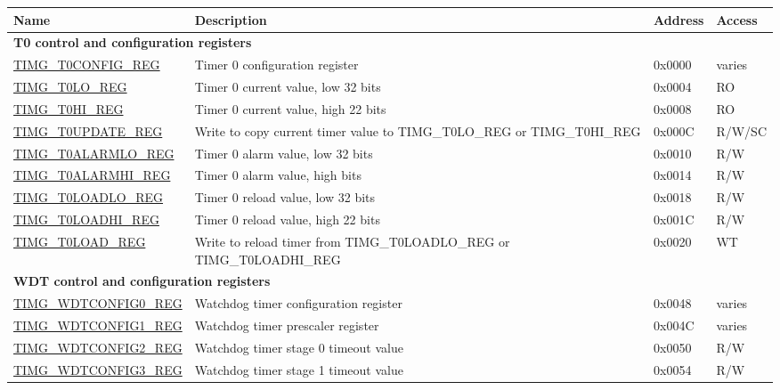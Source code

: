 \begin{longtable}{ | p{6cm} | p{6.7cm} | p{1.3cm} | p{1.5cm} | }
\hline\rowcolor{lightgray}
Name & Description &  Address & Access \\ \hline
\endhead
\multicolumn{4}{|l|}{\textbf{T0 control and configuration registers}} \\ \hline
\hyperref[regdesc:TIMGTXCONFIGREG]{TIMG\_T0CONFIG\_REG} & Timer 0 configuration register & 0x0000 & varies \\ \hline
\hyperref[regdesc:TIMGTXLOREG]{TIMG\_T0LO\_REG} & Timer 0 current value, low 32 bits & 0x0004 & RO \\ \hline
\hyperref[regdesc:TIMGTXHIREG]{TIMG\_T0HI\_REG} & Timer 0 current value, high 22 bits & 0x0008 & RO \\ \hline
\hyperref[regdesc:TIMGTXUPDATEREG]{TIMG\_T0UPDATE\_REG} & Write to copy current timer value to TIMG\_T0LO\_REG or TIMG\_T0HI\_REG & 0x000C & R/W/SC \\ \hline
\hyperref[regdesc:TIMGTXALARMLOREG]{TIMG\_T0ALARMLO\_REG} & Timer 0 alarm value, low 32 bits & 0x0010 & R/W \\ \hline
\hyperref[regdesc:TIMGTXALARMHIREG]{TIMG\_T0ALARMHI\_REG} & Timer 0 alarm value, high bits & 0x0014 & R/W \\ \hline
\hyperref[regdesc:TIMGTXLOADLOREG]{TIMG\_T0LOADLO\_REG} & Timer 0 reload value, low 32 bits & 0x0018 & R/W \\ \hline
\hyperref[regdesc:TIMGTXLOADHIREG]{TIMG\_T0LOADHI\_REG} & Timer 0 reload value, high 22 bits & 0x001C & R/W \\ \hline
\hyperref[regdesc:TIMGTXLOADREG]{TIMG\_T0LOAD\_REG} & Write to reload timer from TIMG\_T0LOADLO\_REG or TIMG\_T0LOADHI\_REG & 0x0020 & WT \\ \hline
\multicolumn{4}{|l|}{\textbf{WDT control and configuration registers}} \\ \hline
\hyperref[regdesc:TIMGWDTCONFIG0REG]{TIMG\_WDTCONFIG0\_REG} & Watchdog timer configuration register & 0x0048 & varies \\ \hline
\hyperref[regdesc:TIMGWDTCONFIG1REG]{TIMG\_WDTCONFIG1\_REG} & Watchdog timer prescaler register & 0x004C & varies \\ \hline
\hyperref[regdesc:TIMGWDTCONFIG2REG]{TIMG\_WDTCONFIG2\_REG} & Watchdog timer stage 0 timeout value & 0x0050 & R/W \\ \hline
\hyperref[regdesc:TIMGWDTCONFIG3REG]{TIMG\_WDTCONFIG3\_REG} & Watchdog timer stage 1 timeout value & 0x0054 & R/W \\ \hline

\end{longtable}

